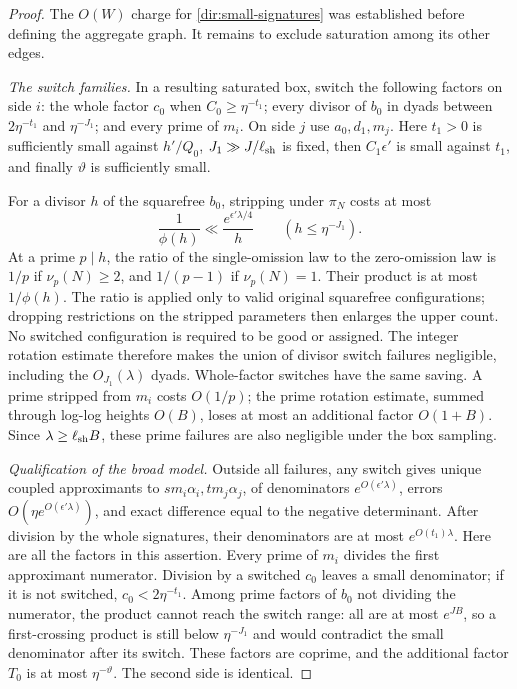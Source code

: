 \begin{proof}
The $O(W)$ charge for \eqref{dir:small-signatures} was established
before defining the aggregate graph. It remains to exclude saturation
among its other edges.

\emph{The switch families.}
In a resulting saturated box, switch the following factors on side
$i$: the whole factor $c_0$ when $C_0\ge\eta^{-t_1}$; every divisor
of $b_0$ in dyads between $2\eta^{-t_1}$ and $\eta^{-J_1}$; and
every prime of $m_i$. On side $j$ use $a_0,d_1,m_j$.
Here $t_1>0$ is sufficiently small against $h'/Q_0$,
$J_1\gg J/\ell_{\rm sh}$ is fixed, then
$C_1\epsilon'$ is small against $t_1$, and finally $\vartheta$ is
sufficiently small.

For a divisor $h$ of the squarefree $b_0$, stripping under $\pi_N$
costs at most
\[
 \frac1{\phi(h)}
       \ll\frac{e^{\epsilon'\lambda/4}}h
       \qquad(h\le\eta^{-J_1}).
\]
At a prime $p\mid h$, the ratio of the single-omission law to the
zero-omission law is $1/p$ if $\nu_p(N)\ge2$, and $1/(p-1)$ if
$\nu_p(N)=1$. Their product is at most $1/\phi(h)$.
The ratio is applied only to valid original squarefree configurations;
dropping restrictions on the stripped parameters then enlarges the
upper count. No switched configuration is required to be good or
assigned.
The integer rotation estimate therefore makes the union of divisor
switch failures negligible, including the $O_{J_1}(\lambda)$ dyads.
Whole-factor switches have the same saving. A prime stripped from
$m_i$ costs $O(1/p)$; the prime rotation estimate, summed through
log-log heights $O(B)$, loses at most an additional factor $O(1+B)$.
Since $\lambda\ge\ell_{\rm sh}B$, these prime failures are also
negligible under the box sampling.

\emph{Qualification of the broad model.}
Outside all failures, any switch gives unique coupled approximants
to $s m_i\alpha_i,t m_j\alpha_j$, of denominators
$e^{O(\epsilon'\lambda)}$, errors
$O(\eta e^{O(\epsilon'\lambda)})$, and exact difference equal to
the negative determinant. After division by the whole signatures,
their denominators are at most $e^{O(t_1)\lambda}$. Here are all
the factors in this assertion. Every prime of $m_i$ divides the
first approximant numerator. Division by a switched $c_0$ leaves
a small denominator; if it is not switched, $c_0<2\eta^{-t_1}$.
Among prime factors of $b_0$ not dividing the numerator, the product
cannot reach the switch range: all are at most $e^{JB}$, so a
first-crossing product is still below $\eta^{-J_1}$ and would
contradict the small denominator after its switch. These factors
are coprime, and the additional factor $T_0$ is at most
$\eta^{-\vartheta}$. The second side is identical.


\end{proof}
